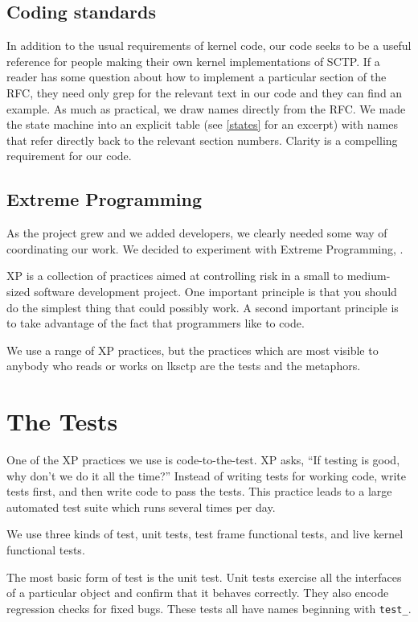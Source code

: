 \documentclass[twocolumn]{article}
\begin{document}
\subsection{Coding standards}

In addition to the usual requirements of kernel code, our code seeks
to be a useful reference for people making their own kernel
implementations of SCTP.  If a reader has some question about how to
implement a particular section of the RFC, they need only grep for the
relevant text in our code and they can find an example.  As much as
practical, we draw names directly from the RFC.  We made the state
machine into an explicit table (see \ref{states} for an
excerpt) with names that refer directly back to the relevant section
numbers.  Clarity is a compelling requirement for our code.

\subsection{Extreme Programming}

As the project grew and we added developers, we clearly needed some
way of coordinating our work.  We decided to experiment with Extreme
Programming, \cite{xp}.

XP is a collection of practices aimed at controlling risk in a small
to medium-sized software development project.  One important principle
is that you should do the simplest thing that could possibly work.  A
second important principle is to take advantage of the fact that
programmers like to code.

We use a range of XP practices, but the practices which are most
visible to anybody who reads or works on lksctp are the tests and the
metaphors.

\section{The Tests}

One of the XP practices we use is code-to-the-test.  XP asks, ``If
testing is good, why don't we do it all the time?'' Instead of writing
tests for working code, write tests first, and then write code to pass
the tests.  This practice leads to a large automated test suite which
runs several times per day.

We use three kinds of test, unit tests, test frame functional tests,
and live kernel functional tests.

The most basic form of test is the unit test.  Unit tests exercise all
the interfaces of a particular object and confirm that it behaves
correctly.  They also encode regression checks for fixed bugs.  These
tests all have names beginning with \texttt{test\_}.
\end{document}
